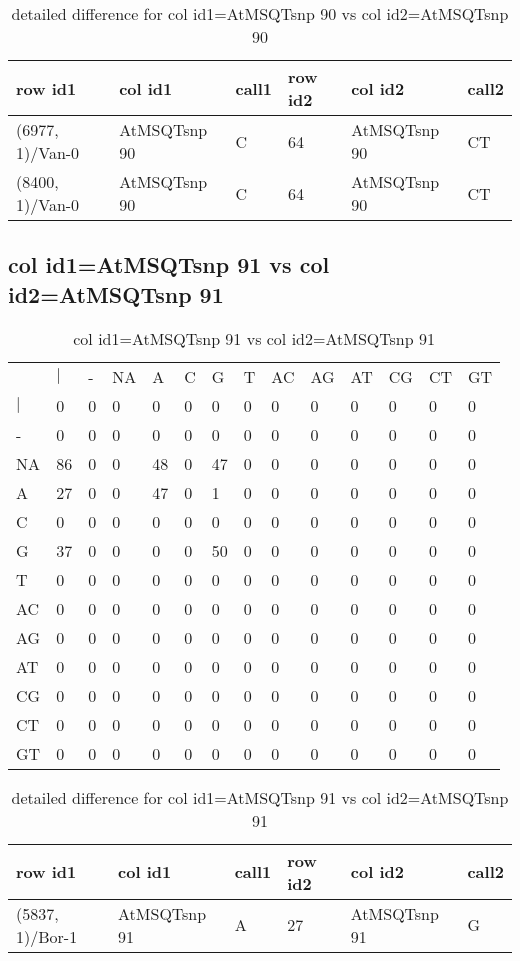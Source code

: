 \begin{center}
\begin{longtable}{|l|l|l|l|l|l|}
\caption{detailed difference for col id1=AtMSQTsnp 90 vs col id2=AtMSQTsnp 90} \label{table_dm979}\\
\hline
row id1&col id1&call1&row id2&col id2&call2\\
\hline
(6977, 1)/Van-0&AtMSQTsnp 90&C&64&AtMSQTsnp 90&CT\\
(8400, 1)/Van-0&AtMSQTsnp 90&C&64&AtMSQTsnp 90&CT\\
\hline
\end{longtable}
\end{center}

\subsection{col id1=AtMSQTsnp 91 vs col id2=AtMSQTsnp 91}
\begin{center}
\begin{longtable}{|l|l|l|l|l|l|l|l|l|l|l|l|l|l|}
\caption{col id1=AtMSQTsnp 91 vs col id2=AtMSQTsnp 91} \label{table_dm980}\\
\hline
\\
\hline
&$|$&-&NA&A&C&G&T&AC&AG&AT&CG&CT&GT\\
$|$&0&0&0&0&0&0&0&0&0&0&0&0&0\\
-&0&0&0&0&0&0&0&0&0&0&0&0&0\\
NA&86&0&0&48&0&47&0&0&0&0&0&0&0\\
A&27&0&0&47&0&1&0&0&0&0&0&0&0\\
C&0&0&0&0&0&0&0&0&0&0&0&0&0\\
G&37&0&0&0&0&50&0&0&0&0&0&0&0\\
T&0&0&0&0&0&0&0&0&0&0&0&0&0\\
AC&0&0&0&0&0&0&0&0&0&0&0&0&0\\
AG&0&0&0&0&0&0&0&0&0&0&0&0&0\\
AT&0&0&0&0&0&0&0&0&0&0&0&0&0\\
CG&0&0&0&0&0&0&0&0&0&0&0&0&0\\
CT&0&0&0&0&0&0&0&0&0&0&0&0&0\\
GT&0&0&0&0&0&0&0&0&0&0&0&0&0\\
\hline
\end{longtable}
\end{center}

\begin{center}
\begin{longtable}{|l|l|l|l|l|l|}
\caption{detailed difference for col id1=AtMSQTsnp 91 vs col id2=AtMSQTsnp 91} \label{table_dm981}\\
\hline
row id1&col id1&call1&row id2&col id2&call2\\
\hline
(5837, 1)/Bor-1&AtMSQTsnp 91&A&27&AtMSQTsnp 91&G\\
\hline
\end{longtable}
\end{center}

